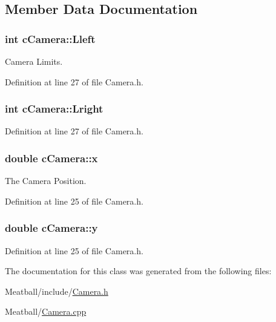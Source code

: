 \subsection{Member Data Documentation}
\hypertarget{classc_camera_a809224c5974f73a689db51e49bc1afd3}{
\subsubsection[{Lleft}]{\setlength{\rightskip}{0pt plus 5cm}int c\-Camera\-::\-Lleft}}\label{classc_camera_a809224c5974f73a689db51e49bc1afd3}


Camera Limits. 



Definition at line 27 of file Camera.\-h.

\hypertarget{classc_camera_ab4c7149b1d6b3f011d8bf8b47a2e05ca}{
\subsubsection[{Lright}]{\setlength{\rightskip}{0pt plus 5cm}int c\-Camera\-::\-Lright}}\label{classc_camera_ab4c7149b1d6b3f011d8bf8b47a2e05ca}


Definition at line 27 of file Camera.\-h.

\hypertarget{classc_camera_a8d1c4c332fe0231e63d5da1567b56ea6}{
\subsubsection[{x}]{\setlength{\rightskip}{0pt plus 5cm}double c\-Camera\-::x}}\label{classc_camera_a8d1c4c332fe0231e63d5da1567b56ea6}


The Camera Position. 



Definition at line 25 of file Camera.\-h.

\hypertarget{classc_camera_ad49020fabd1bdac433d9a92d2b6b96b2}{
\subsubsection[{y}]{\setlength{\rightskip}{0pt plus 5cm}double c\-Camera\-::y}}\label{classc_camera_ad49020fabd1bdac433d9a92d2b6b96b2}


Definition at line 25 of file Camera.\-h.



The documentation for this class was generated from the following files\-:\begin{DoxyCompactItemize}
\item 
Meatball/include/\hyperlink{_camera_8h}{Camera.\-h}\item 
Meatball/\hyperlink{_camera_8cpp}{Camera.\-cpp}\end{DoxyCompactItemize}
